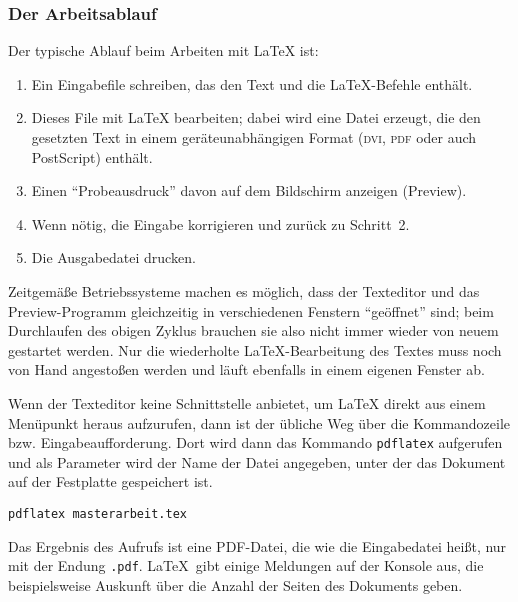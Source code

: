 \subsubsection{Der Arbeitsablauf}
Der typische Ablauf beim Arbeiten mit \LaTeX{} ist:
\begin{enumerate}
  \item Ein Eingabefile schreiben, das den Text und die \LaTeX-Befehle 
  enthält.
  \item Dieses File mit \LaTeX{} bearbeiten; dabei wird eine Datei
  erzeugt, die den gesetzten Text in einem geräteunabhängigen Format
  (\textsc{dvi}, \textsc{pdf} oder auch PostScript) enthält.
  \item Einen "`Probeausdruck"' davon auf dem Bildschirm anzeigen (Preview).
  \item Wenn nötig, die Eingabe korrigieren und zurück zu Schritt~2.
  \item Die Ausgabedatei drucken.
\end{enumerate}
Zeitgemäße Betriebssysteme machen es möglich, dass der Texteditor
und das Preview-Programm gleichzeitig in verschiedenen Fenstern 
"`geöffnet"' sind; beim Durchlaufen des obigen Zyklus brauchen sie 
also nicht immer wieder von neuem gestartet werden.  Nur die 
wiederholte \LaTeX-Bearbeitung des Textes muss noch von Hand 
angestoßen werden und läuft ebenfalls in einem eigenen Fenster ab.


Wenn der Texteditor keine Schnittstelle anbietet, um \LaTeX{} direkt aus einem Menüpunkt heraus aufzurufen, dann ist der übliche Weg über die Kommandozeile bzw. Eingabeaufforderung. Dort wird dann das Kommando \texttt{pdflatex} aufgerufen und als Parameter wird der Name der Datei angegeben, unter der das Dokument auf der Festplatte gespeichert ist.
\begin{beispiel}
  \texttt{pdflatex masterarbeit.tex}
\end{beispiel}
Das Ergebnis des Aufrufs ist eine PDF-Datei, die wie die Eingabedatei heißt, nur mit der Endung \texttt{.pdf}. \LaTeX\ gibt einige Meldungen auf der Konsole aus, die beispielsweise Auskunft über die Anzahl der Seiten des Dokuments geben.

